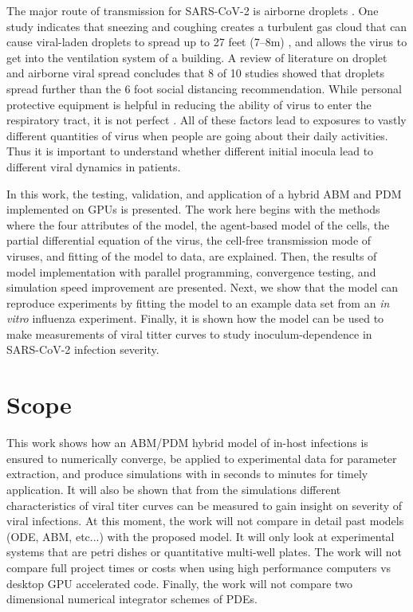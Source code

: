 The major route of transmission for SARS-CoV-2 is airborne droplets \cite{morawska20}. One study indicates that sneezing and coughing creates a turbulent gas cloud that can cause viral-laden droplets to spread up to 27 feet (\numrange[range-phrase = --]{7}{8}\si{\meter}) \cite{bourouiba20}, and allows the virus to get into the ventilation system of a building. A review of literature on droplet and airborne viral spread concludes that 8 of 10 studies showed that droplets spread further than the 6 foot \cite{bahl20} social distancing recommendation. While personal protective equipment is helpful in reducing the ability of virus to enter the respiratory tract, it is not perfect \cite{mittal20}. All of these factors lead to exposures to vastly different quantities of virus when people are going about their daily activities. Thus it is important to understand whether different initial inocula lead to different viral dynamics in patients. 

In this work, the testing, validation, and application of a hybrid ABM and PDM implemented on GPUs is presented.
The work here begins with the methods where the four attributes of the model, the agent-based model of the cells, the partial differential equation of the virus, the cell-free transmission mode of viruses, and fitting of the model to data, are explained. 
Then, the results of model implementation with parallel programming, convergence testing, and simulation speed improvement are presented.
Next, we show that the model can reproduce experiments by fitting the model to an example data set from an \emph{in vitro} influenza experiment.
Finally, it is shown how the model can be used to make measurements of viral titter curves to study inoculum-dependence in SARS-CoV-2 infection severity. 

\section{Scope}
This work shows how an ABM/PDM hybrid model of in-host infections is ensured to numerically converge, be applied to experimental data for parameter extraction, and produce simulations with in seconds to minutes for timely application. It will also be shown that from the simulations different characteristics of viral titer curves can be measured to gain insight on severity of viral infections. At this moment, the work will not compare in detail past models (ODE, ABM, etc...) with the proposed model. It will only look at experimental systems that are petri dishes or quantitative multi-well plates. The work will not compare full project times or costs when using high performance computers vs desktop GPU accelerated code. Finally, the work will not compare two dimensional numerical integrator schemes of PDEs.




